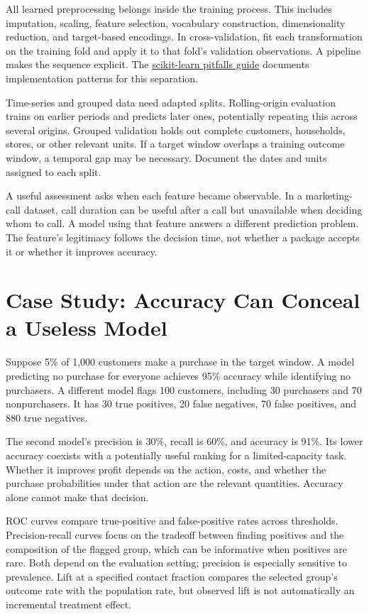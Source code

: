 All learned preprocessing belongs inside the training process. This
includes imputation, scaling, feature selection, vocabulary
construction, dimensionality reduction, and target-based encodings. In
cross-validation, fit each transformation on the training fold and apply
it to that fold's validation observations. A pipeline makes the sequence
explicit. The
\href{https://scikit-learn.org/stable/common_pitfalls.html}{scikit-learn
pitfalls guide} documents implementation patterns for this separation.

Time-series and grouped data need adapted splits. Rolling-origin
evaluation trains on earlier periods and predicts later ones,
potentially repeating this across several origins. Grouped validation
holds out complete customers, households, stores, or other relevant
units. If a target window overlaps a training outcome window, a temporal
gap may be necessary. Document the dates and units assigned to each
split.

A useful assessment asks when each feature became observable. In a
marketing-call dataset, call duration can be useful after a call but
unavailable when deciding whom to call. A model using that feature
answers a different prediction problem. The feature's legitimacy follows
the decision time, not whether a package accepts it or whether it
improves accuracy.

\hypertarget{M07-case-study-accuracy-can-conceal-a-useless-model}{%
\section{Case Study: Accuracy Can Conceal a Useless
Model}\label{M07-case-study-accuracy-can-conceal-a-useless-model}}

\noindent Suppose 5\% of 1,000 customers make a purchase in the target window. A
model predicting no purchase for everyone achieves 95\% accuracy while
identifying no purchasers. A different model flags 100 customers,
including 30 purchasers and 70 nonpurchasers. It has 30 true positives,
20 false negatives, 70 false positives, and 880 true negatives.

The second model's precision is 30\%, recall is 60\%, and accuracy is
91\%. Its lower accuracy coexists with a potentially useful ranking for
a limited-capacity task. Whether it improves profit depends on the
action, costs, and whether the purchase probabilities under that action
are the relevant quantities. Accuracy alone cannot make that decision.

ROC curves compare true-positive and false-positive rates across
thresholds. Precision-recall curves focus on the tradeoff between
finding positives and the composition of the flagged group, which can be
informative when positives are rare. Both depend on the evaluation
setting; precision is especially sensitive to prevalence. Lift at a
specified contact fraction compares the selected group's outcome rate
with the population rate, but observed lift is not automatically an
incremental treatment effect.

